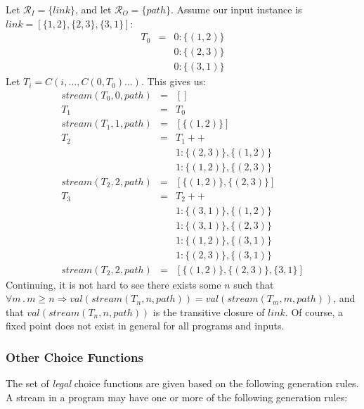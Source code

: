\begin{example}
\noindent Let $\mathcal{R}_I = \{link\}$, and let $\mathcal{R}_O = \{path\}$.  Assume our input instance is $link = [\{1,2\}, \{2,3\}, \{3,1\}]$:
\begin{eqnarray*}
T_0 & = & 0 : \{(1,2)\} \\
 		&		& 0 : \{(2,3)\} \\
		&		& 0 : \{(3,1)\}
\end{eqnarray*}
Let $T_i = C(i, \ldots, C(0, T_0) \ldots )$. This gives us:
\begin{eqnarray*}
stream(T_0,0,path) & = & [] \\
T_1 & = & T_0 \\
stream(T_1,1,path) & = & [\{(1,2)\}] \\
T_2 & = & T_1 ++ \\
& & 1: \{(2,3)\}, \{(1,2)\} \\
& & 1: \{(1,2)\}, \{(2,3)\} \\
stream(T_2,2,path) & = & [\{(1,2)\}, \{(2,3)\}] \\
T_3 & = & T_2 ++ \\
& & 1: \{(3,1)\}, \{(1,2)\} \\
& & 1: \{(3,1)\}, \{(2,3)\} \\
& & 1: \{(1,2)\}, \{(3,1)\} \\
& & 1: \{(2,3)\}, \{(3,1)\} \\
stream(T_2,2,path) & = & [\{(1,2)\}, \{(2,3)\}, \{3,1\}]
\end{eqnarray*}
Continuing, it is not hard to see there exists some $n$ such that $\forall m \, . \, m \geq n \Rightarrow val(stream(T_n,n,path)) = val(stream(T_m,m,path))$, and that $val(stream(T_n,n,path))$ is the transitive closure of $link$.  Of course, a fixed point does not exist in general for all programs and inputs.
\end{example}

\subsubsection{Other Choice Functions}

The set of {\em legal} choice functions are given based on the following generation rules.  A stream in a program may have one or more of the following generation rules:

